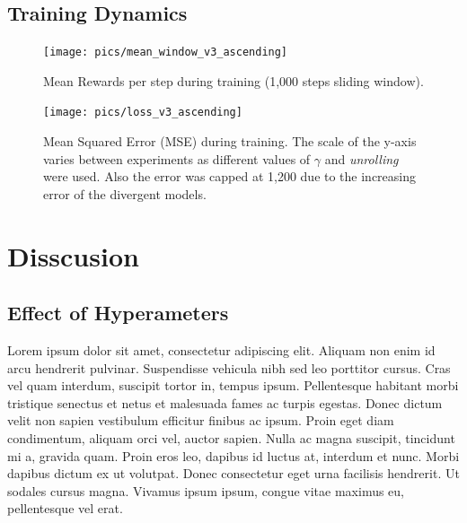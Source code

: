 \documentclass[
  openany]{book}
\begin{document}
\hypertarget{training-dynamics}{%
\subsection{Training Dynamics}\label{training-dynamics}}



\begin{figure}

{\centering \texttt{[image: pics/mean\_window\_v3\_ascending]} 

}

\caption{Mean Rewards per step during training (1,000 steps sliding window).}\label{fig:training-mean-window}
\end{figure}



\begin{figure}

{\centering \texttt{[image: pics/loss\_v3\_ascending]} 

}

\caption{Mean Squared Error (MSE) during training. The scale of the y-axis varies between experiments as different values of \(\gamma\) and \emph{unrolling} were used. Also the error was capped at 1,200 due to the increasing error of the divergent models.}\label{fig:loss}
\end{figure}

\hypertarget{disscusion}{%
\section{Disscusion}\label{disscusion}}

\hypertarget{effect-of-hyperameters}{%
\subsection{Effect of Hyperameters}\label{effect-of-hyperameters}}

Lorem ipsum dolor sit amet, consectetur adipiscing elit. Aliquam non enim id arcu hendrerit pulvinar. Suspendisse vehicula nibh sed leo porttitor cursus. Cras vel quam interdum, suscipit tortor in, tempus ipsum. Pellentesque habitant morbi tristique senectus et netus et malesuada fames ac turpis egestas. Donec dictum velit non sapien vestibulum efficitur finibus ac ipsum. Proin eget diam condimentum, aliquam orci vel, auctor sapien. Nulla ac magna suscipit, tincidunt mi a, gravida quam. Proin eros leo, dapibus id luctus at, interdum et nunc. Morbi dapibus dictum ex ut volutpat. Donec consectetur eget urna facilisis hendrerit. Ut sodales cursus magna. Vivamus ipsum ipsum, congue vitae maximus eu, pellentesque vel erat.
\end{document}
